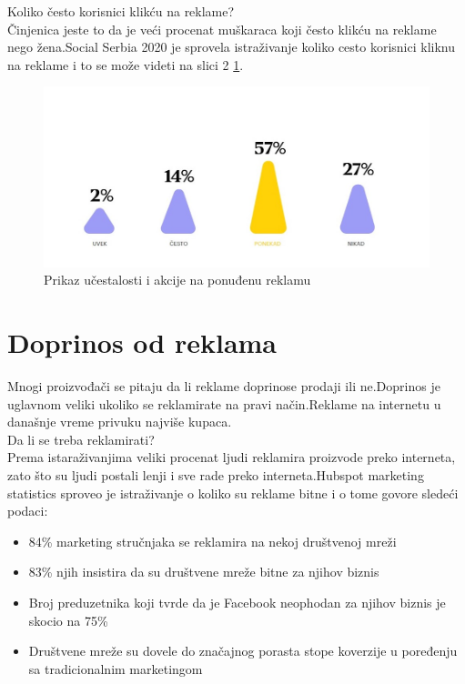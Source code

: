 \documentclass[a4paper]{article}
\begin{document}
	
	Koliko često korisnici klikću na reklame?\\
	Činjenica jeste to da je veći procenat muškaraca koji često klikću na reklame nego žena.Social Serbia 2020 \cite{socialserbia} je sprovela istraživanje koliko cesto korisnici kliknu na reklame i to se može videti na slici 2 \ref{fig:klik_na_reklamu}.\\
	
	
	\begin{figure}[h!]
		\begin{center}
			\includegraphics[scale=0.55]{klik_na_reklamu.jpg}
		\end{center}
		\caption{Prikaz učestalosti i akcije na ponuđenu reklamu}
		\label{fig:klik_na_reklamu}
	\end{figure}
	\section{Doprinos od reklama}
	\label{sec:doprinos}
	Mnogi proizvođači se pitaju da li reklame doprinose prodaji ili ne.Doprinos je uglavnom veliki ukoliko se reklamirate na pravi način.Reklame na internetu u današnje vreme privuku najviše kupaca.\\
	Da li se treba reklamirati?\\
	Prema istaraživanjima veliki procenat ljudi reklamira proizvode preko interneta, zato što su ljudi postali lenji i sve rade preko interneta.Hubspot marketing statistics \cite{marketingstatistics} sproveo je istraživanje o koliko su reklame bitne i o tome govore sledeći podaci: \\
	\begin{itemize}
		\item 84\% marketing stručnjaka se reklamira na nekoj društvenoj mreži
		\item 83\% njih insistira da su društvene mreže bitne za njihov biznis
		\item Broj preduzetnika koji tvrde da je Facebook neophodan za njihov biznis je skocio na 75\%
		\item Društvene mreže su dovele do značajnog porasta stope koverzije u poređenju sa tradicionalnim marketingom 
	\end{itemize} \\
	
\end{document}
